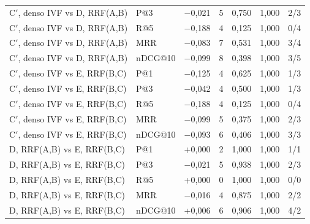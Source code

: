 {\begin{longtable}{llccccl}
C$'$, denso IVF vs D, RRF(A,B) & P@3 & $-$0{,}021 & 5 & 0{,}750 & 1{,}000 & 2/3 \\
C$'$, denso IVF vs D, RRF(A,B) & R@5 & $-$0{,}188 & 4 & 0{,}125 & 1{,}000 & 0/4 \\
C$'$, denso IVF vs D, RRF(A,B) & MRR & $-$0{,}083 & 7 & 0{,}531 & 1{,}000 & 3/4 \\
C$'$, denso IVF vs D, RRF(A,B) & nDCG@10 & $-$0{,}099 & 8 & 0{,}398 & 1{,}000 & 3/5 \\
C$'$, denso IVF vs E, RRF(B,C) & P@1 & $-$0{,}125 & 4 & 0{,}625 & 1{,}000 & 1/3 \\
C$'$, denso IVF vs E, RRF(B,C) & P@3 & $-$0{,}042 & 4 & 0{,}500 & 1{,}000 & 1/3 \\
C$'$, denso IVF vs E, RRF(B,C) & R@5 & $-$0{,}188 & 4 & 0{,}125 & 1{,}000 & 0/4 \\
C$'$, denso IVF vs E, RRF(B,C) & MRR & $-$0{,}099 & 5 & 0{,}375 & 1{,}000 & 2/3 \\
C$'$, denso IVF vs E, RRF(B,C) & nDCG@10 & $-$0{,}093 & 6 & 0{,}406 & 1{,}000 & 3/3 \\
D, RRF(A,B) vs E, RRF(B,C) & P@1 & +0{,}000 & 2 & 1{,}000 & 1{,}000 & 1/1 \\
D, RRF(A,B) vs E, RRF(B,C) & P@3 & $-$0{,}021 & 5 & 0{,}938 & 1{,}000 & 2/3 \\
D, RRF(A,B) vs E, RRF(B,C) & R@5 & +0{,}000 & 0 & 1{,}000 & 1{,}000 & 0/0 \\
D, RRF(A,B) vs E, RRF(B,C) & MRR & $-$0{,}016 & 4 & 0{,}875 & 1{,}000 & 2/2 \\
D, RRF(A,B) vs E, RRF(B,C) & nDCG@10 & +0{,}006 & 6 & 0{,}906 & 1{,}000 & 4/2 \\
\bottomrule
\end{longtable}
}
